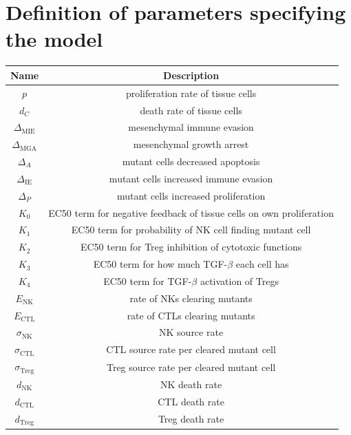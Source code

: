 \documentclass[11pt, a4paper, preprint]{article}
\begin{document}
\section{Definition of parameters specifying the model}

\begin{table}[H]
\begin{center}
 \begin{tabular}{| c | c|} 
 \hline
 Name & Description  \\ [0.5ex] 
 \hline
 $p$ & proliferation rate of tissue cells \\ 
 \hline
 $d_C$  & death rate of tissue cells \\
 \hline
$\Delta_\text{MIE}$ &  mesenchymal immune evasion \\
 \hline
 $\Delta_\text{MGA}$ & mesenchymal growth arrest    \\
 \hline
  $\Delta_A$ & mutant cells decreased apoptosis  \\
  \hline
  $\Delta_\text{IE}$ & mutant cells increased immune evasion  \\
  \hline
  $\Delta_P$ & mutant cells increased proliferation  \\
  \hline
 $K_0$ & EC50 term for negative feedback of tissue cells on own proliferation\\
 \hline
 $K_1$ & EC50 term for probability of NK cell finding mutant cell\\
 \hline
  $K_2$ & EC50 term for Treg inhibition of cytotoxic functions  \\
  \hline
  $K_3$ & EC50 term for how much TGF-$\beta$ each cell has \\
  \hline
  $K_4$ & EC50 term for TGF-$\beta$ activation of Tregs \\
  \hline
 $E_\text{NK}$ & rate of NKs clearing mutants  \\
  \hline
  $E_\text{CTL}$ & rate of CTLs clearing mutants \\
  \hline
  $\sigma_\text{NK}$ & NK source rate \\ 
  \hline
  $\sigma_\text{CTL}$ & CTL source rate per cleared mutant cell \\ 
  \hline
  $\sigma_\text{Treg}$ & Treg source rate per cleared mutant cell \\ 
  \hline
  $d_\text{NK}$ & NK death rate  \\ 
  \hline
  $d_\text{CTL}$ & CTL death rate \\ 
  \hline
  $d_\text{Treg}$ & Treg death rate \\ 
  \hline

\end{tabular}
\end{center}
\end{table}
\end{document}
